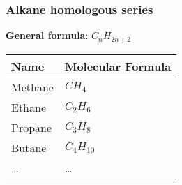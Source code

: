 \documentclass[11pt]{article}
\begin{document}
\subsubsection{Alkane homologous series}
\label{sec:orgdb7fe15}
\textbf{General formula}: \(C_nH_{2n+2}\)
\begin{center}
\begin{tabular}{ll}
Name & Molecular Formula\\
\hline
Methane & \(CH_4\)\\
Ethane & \(C_2H_6\)\\
Propane & \(C_3H_8\)\\
Butane & \(C_4H_{10}\)\\
\ldots{} & \ldots{}\\
\end{tabular}
\end{center}
\end{document}

